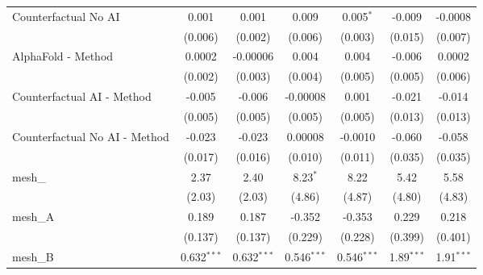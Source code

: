 \begin{tabular}{lcccccc}
   Counterfactual No AI                                        & 0.001          & 0.001          & 0.009          & 0.005$^{*}$    & -0.009        & -0.0008\\   
                                                               & (0.006)        & (0.002)        & (0.006)        & (0.003)        & (0.015)       & (0.007)\\   
   AlphaFold - Method                                          & 0.0002         & -0.00006       & 0.004          & 0.004          & -0.006        & 0.0002\\   
                                                               & (0.002)        & (0.003)        & (0.004)        & (0.005)        & (0.005)       & (0.006)\\   
   Counterfactual AI - Method                                  & -0.005         & -0.006         & -0.00008       & 0.001          & -0.021        & -0.014\\   
                                                               & (0.005)        & (0.005)        & (0.005)        & (0.005)        & (0.013)       & (0.013)\\   
   Counterfactual No AI - Method                               & -0.023         & -0.023         & 0.00008        & -0.0010        & -0.060        & -0.058\\   
                                                               & (0.017)        & (0.016)        & (0.010)        & (0.011)        & (0.035)       & (0.035)\\   
   mesh\_                                                      & 2.37           & 2.40           & 8.23$^{*}$     & 8.22           & 5.42          & 5.58\\   
                                                               & (2.03)         & (2.03)         & (4.86)         & (4.87)         & (4.80)        & (4.83)\\   
   mesh\_A                                                     & 0.189          & 0.187          & -0.352         & -0.353         & 0.229         & 0.218\\   
                                                               & (0.137)        & (0.137)        & (0.229)        & (0.228)        & (0.399)       & (0.401)\\   
   mesh\_B                                                     & 0.632$^{***}$  & 0.632$^{***}$  & 0.546$^{***}$  & 0.546$^{***}$  & 1.89$^{***}$  & 1.91$^{***}$\\   

\end{tabular}

